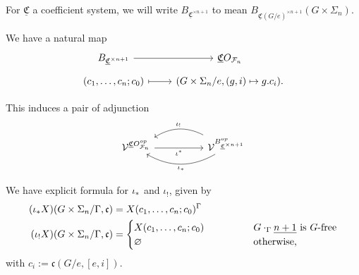 \documentclass[a4paper,10pt
]{article}%
\newcommand{\UC}{\underline{\mathfrak C}}
\renewcommand{\F}{\mathcal F}
\renewcommand{\1}{\ensuremath{\mathbb{id}}}
\begin{document}
\begin{notation}
      For $\UC$ a coefficient system, we will write $B_{\UC^{\times n+1}}$ to mean
      $B_{\UC(G/e)^{\times n+1}}(G \times \Sigma_n)$.
\end{notation}

We have a natural map
\begin{equation}
      \begin{tikzcd}[row sep = tiny]
            B_{\UC^{\times n+1}} \arrow[r]
            &
            \UC O_{\F_n}
            \\
            (c_1,\dots,c_n;c_0) \arrow[r, mapsto]
            &
            (G \times \Sigma_n/e, (g,i) \mapsto g.c_i).
      \end{tikzcd}
\end{equation}

This induces a pair of adjunction
\begin{equation}
      \begin{tikzcd}[column sep =5em]
            \V^{\UC O_{\F_n}^{op}} \arrow[r, "\iota^{\**}"']
            &
            \V^{B_{\UC^{\times n+1}}^{op}}
            \arrow[l, bend right, "\iota_{!}"']
            \arrow[l, bend left, "\iota_{\**}"]
      \end{tikzcd}
\end{equation}

We have explicit formula for $\iota_{\**}$ and $\iota_!$, given by
\begin{align*}
  (\iota_{\**} X)(G \times \Sigma_n/\Gamma, \mathfrak c) &= X(c_1,\dots, c_n;c_0)^\Gamma\\
  (\iota_! X)(G \times \Sigma_n/\Gamma, \mathfrak c) &=
                                                       {\begin{cases}
                                                               X(c_1,\dots,c_n;c_0) \qquad \qquad & G \cdot_\Gamma \underline{n+1} \mbox{ is $G$-free} \\
                                                               \varnothing & \mbox{otherwise,}
                                                       \end{cases}}
\end{align*}
with  $c_i := \mathfrak c(G/e, [e, i])$.
\end{document}

